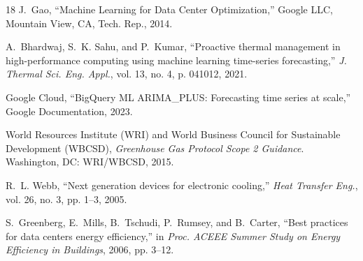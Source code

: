 \documentclass[journal]{IEEEtran}
\begin{document}
\begin{thebibliography}{18}
J.~Gao, ``Machine Learning for Data Center Optimization,'' Google LLC, Mountain View, CA, Tech. Rep., 2014.

A.~Bhardwaj, S.~K. Sahu, and P.~Kumar, ``Proactive thermal management in high-performance computing using machine learning time-series forecasting,'' {\em J. Thermal Sci. Eng. Appl.}, vol. 13, no. 4, p. 041012, 2021.

Google Cloud, ``BigQuery ML ARIMA\_PLUS: Forecasting time series at scale,'' Google Documentation, 2023.

World Resources Institute (WRI) and World Business Council for Sustainable Development (WBCSD), {\em Greenhouse Gas Protocol Scope 2 Guidance}. Washington, DC: WRI/WBCSD, 2015.

R.~L. Webb, ``Next generation devices for electronic cooling,'' {\em Heat Transfer Eng.}, vol. 26, no. 3, pp. 1--3, 2005.

S.~Greenberg, E.~Mills, B.~Tschudi, P.~Rumsey, and B.~Carter, ``Best practices for data centers energy efficiency,'' in {\em Proc. ACEEE Summer Study on Energy Efficiency in Buildings}, 2006, pp. 3--12.

\end{thebibliography}
\end{document}
